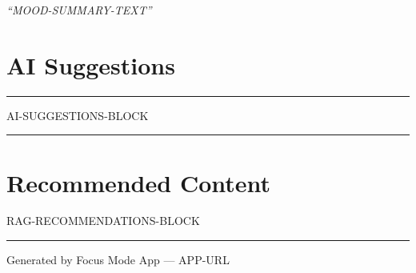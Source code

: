 \documentclass[11pt,a4paper]{article}
\begin{document}
	\vspace{0.5em}
	\emph{“{{MOOD-SUMMARY-TEXT}}”}
	
	\vspace{1.5em}
	
	\section*{AI Suggestions}
	\rule{\textwidth}{0.5pt}
	{{AI-SUGGESTIONS-BLOCK}}
	\rule{\textwidth}{0.5pt}
	
	\vspace{1.5em}
	
	\section*{Recommended Content}
	{{RAG-RECOMMENDATIONS-BLOCK}}
	
	\vfill
	
	\begin{center}
		\rule{\textwidth}{0.5pt}
		\small Generated by Focus Mode App — {{APP-URL}}
	\end{center}
	
\end{document}
